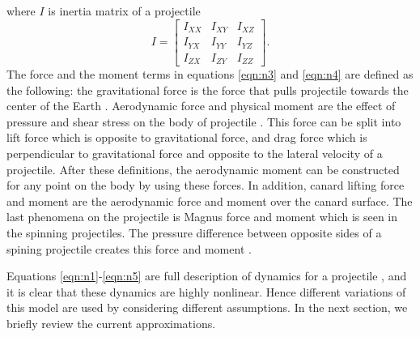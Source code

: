 \documentclass[letterpaper, 10 pt, conference]{ieeeconf}  %
\begin{document}
where $I$ is inertia matrix of a projectile
\begin{equation}
I=
\begin{bmatrix}
I_{XX}& I_{XY} & I_{XZ} \\ I_{YX} & I_{YY} & I_{YZ} \\ I_{ZX} & I_{ZY} & I_{ZZ}
\end{bmatrix}.
\label{eqn:n5}
\end{equation}
The force and the moment terms in equations \eqref{eqn:n3} and \eqref{eqn:n4} are defined as the following: the gravitational force is the force that pulls projectile towards the center of the Earth \cite{cook2012flight}. Aerodynamic force and physical moment are the effect of pressure and shear stress on the body of projectile \cite{anderson2010fundamentals}. This force can be split into lift force which is  opposite to gravitational force, and drag force which is perpendicular to gravitational force and opposite to the lateral velocity of a projectile. After these definitions, the aerodynamic moment can be constructed for any point on the body by using these forces. In addition, canard lifting force and moment are the aerodynamic force and moment over the canard surface. The last phenomena on the projectile is Magnus force and moment which is seen in the spinning projectiles. The pressure difference between opposite sides of a spining projectile creates this force and moment \cite{mccoy1999modern}. 

Equations  \eqref{eqn:n1}-\eqref{eqn:n5} are full description of dynamics for a projectile \cite{etkin2012dynamics}, and it is clear that these dynamics are highly nonlinear. Hence different variations of this model are used by considering different assumptions. In the next section, we briefly review the current approximations.
\end{document}
